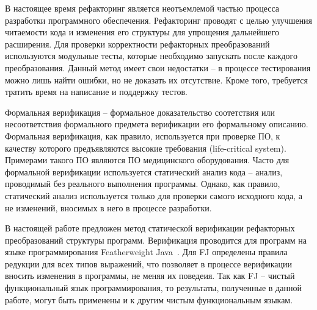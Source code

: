 \startprefacepage

В настоящее время рефакторинг является неотъемлемой частью процесса разработки программного обеспечения.
Рефакторинг проводят с целью улучшения читаемости кода и изменения его структуры для упрощения дальнейшего расширения.
Для проверки корректности рефакторных преобразований используются модульные тесты,
которые необходимо запускать после каждого преобразования.
Данный метод имеет свои недостатки -- в процессе тестирования можно лишь найти ошибки, но не доказать их отсутствие. 
Кроме того, требуется тратить время на написание и поддержку тестов.

Формальная верификация -- формальное доказательство соотетствия или несоответствия формального предмета верификации его формальному описанию.
Формальная верификация, как правило, используется при проверке ПО, к качеству которого предъявляются высокие требования (life-critical system).
Примерами такого ПО являются ПО медицинского оборудования.
Часто для формальной верификации используется статический анализ кода -- анализ, проводимый без реального выполнения программы.
Однако, как правило, статический анализ используется только для проверки самого исходного кода, а не изменений, вносимых в него в процессе разработки.

В настоящей работе предложен метод статической верификации рефакторных преобразований структуры программ.
Верификация проводится для программ на языке программирования Featherweight Java~\cite{fj}.
Для FJ определены правила редукции для всех типов выражений, что позволяет в процессе верификации вносить изменения в программы, не меняя их поведеия.
Так как FJ -- чистый функциональный язык программирования, то результаты, полученные в данной работе,
могут быть применены и к другим чистым функциональным языкам.